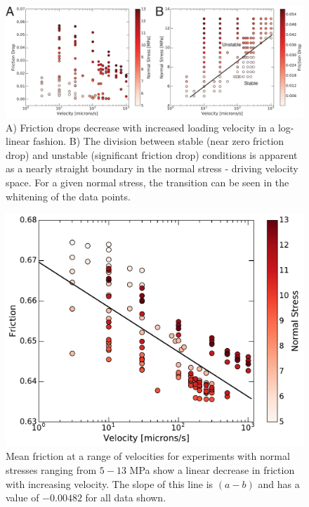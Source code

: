 \clearpage

\begin{figure}[H]
	\centering
		\includegraphics[scale=0.3]{chap_slow_slip_details/Figure_7.pdf}
   	\caption{A) Friction drops decrease with increased loading velocity in a log-linear fashion. B) The division between stable (near zero friction drop) and unstable (significant friction drop) conditions is apparent as a nearly straight boundary in the normal stress - driving velocity space. For a given normal stress, the transition can be seen in the whitening of the data points.}
  	\label{Figure_7}
\end{figure}

\clearpage

\begin{figure}[H]
	\centering
		\includegraphics[scale=0.6]{chap_slow_slip_details/Figure_8.pdf}
   	\caption{Mean friction at a range of velocities for experiments with normal stresses ranging from $5-13$ MPa show a linear decrease in friction with increasing velocity. The slope of this line is $(a-b)$ and has a value of $-0.00482$ for all data shown.}
  	\label{Figure_8}
\end{figure}

